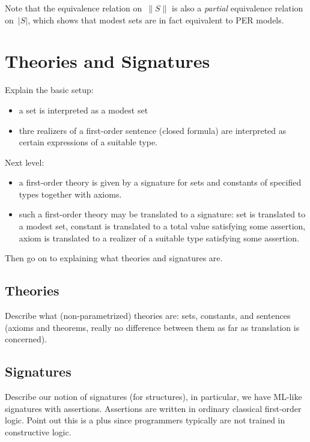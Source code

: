 \documentclass{article}
\newcommand{\ut}[1]{|#1|}
\newcommand{\tot}[1]{\|#1\|}
\begin{document}
Note that the equivalence relation on~$\tot{S}$ is also a
\emph{partial} equivalence relation on~$\ut{S}$, which shows that
modest sets are in fact equivalent to PER models.


\section{Theories and Signatures}
\label{sec:theories-signatures}

Explain the basic setup:
%
\begin{itemize}
\item a set is interpreted as a modest set
\item thre realizers of a first-order sentence (closed formula) are
  interpreted as certain expressions of a suitable type.
\end{itemize}

Next level:
%
\begin{itemize}
\item a first-order theory is given by a signature for sets and
  constants of specified types together with axioms.
\item such a first-order theory may be translated to a signature:
  set is translated to a modest set, constant is translated to a total
  value satisfying some assertion, axiom is translated to a realizer
  of a suitable type satisfying some assertion.
\end{itemize}

Then go on to explaining what theories and signatures are.

\subsection{Theories}
\label{sec:theories}

Describe what (non-parametrized) theories are: sets, constants, and
sentences (axioms and theorems, really no difference between them as
far as translation is concerned).


\subsection{Signatures}
\label{sec:signatures}


Describe our notion of signatures (for structures), in particular, we
have ML-like signatures with assertions. Assertions are written in
ordinary classical first-order logic. Point out this is a plus since
programmers typically are not trained in constructive logic.
\end{document}

